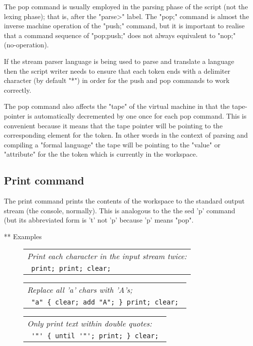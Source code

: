 \documentclass[a4paper,12pt]{article}
\begin{document}
  The pop command is usually employed in the parsing phase
  of the script (not the lexing phase); that is, after the "parse>"
  label. The "pop;" command is almost the inverse machine operation
  of the "push;" command, but it is important to realise that
  a command sequence of "pop;push;" does not always equivalent to
  "nop;" (no-operation).
   
  If the stream parser language is being used to parse and translate a
  language then the script writer needs to ensure that each token ends with a
  delimiter character (by default "*") in order for the push and pop commands
  to work correctly.

  The pop command also affects the "tape" of the virtual machine in
  that the tape-pointer is automatically decremented by one once for
  each pop command. This is convenient because it means that the
  tape pointer will be pointing to the corresponding element for the
  token. In other words in the context of parsing and compiling a
  "formal language" the tape will be pointing to the
  "value" or "attribute" for the the token which is currently in the
  workspace.

\subsection{Print command}

  The print command prints the contents of the workspace to
  the standard output stream (the console, normally). This is
  analogous to the the sed 'p' command (but its abbreviated form
  is 't' not 'p' because 'p' means "pop".

** Examples
 \begin{figure}
 \begin{tabular}{ l }
 \emph{ Print each character in the input stream twice: } \\ 
 \verb| print; print; clear; |
 \end{tabular} 
 \end{figure}
 \begin{figure}
 \begin{tabular}{ l }
 \emph{ Replace all 'a' chars with 'A's; } \\ 
 \verb| "a" { clear; add "A"; } print; clear; |
 \end{tabular} 
 \end{figure}
 \begin{figure}
 \begin{tabular}{ l }
 \emph{ Only print text within double quotes: } \\ 
 \verb| '"' { until '"'; print; } clear; |
 \end{tabular} 
 \end{figure}
    
\end{document}
